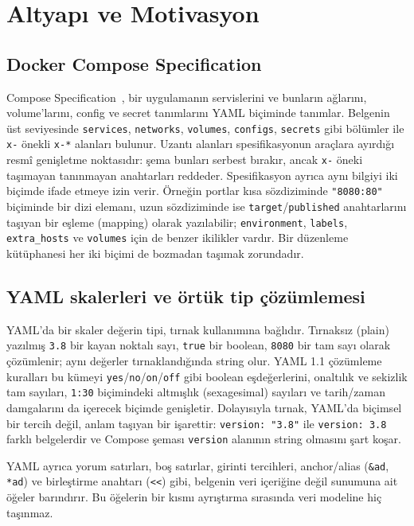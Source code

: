 \documentclass[conference]{IEEEtran}
\begin{document}
\section{Altyapı ve Motivasyon}
\label{sec:altyapi}

\subsection{Docker Compose Specification}
Compose Specification~\cite{composespec}, bir uygulamanın servislerini ve
bunların ağlarını, volume'larını, config ve secret tanımlarını YAML
biçiminde tanımlar. Belgenin üst seviyesinde \texttt{services},
\texttt{networks}, \texttt{volumes}, \texttt{configs}, \texttt{secrets} gibi
bölümler ile \texttt{x-} önekli \texttt{x-*} alanları bulunur. Uzantı
alanları spesifikasyonun araçlara ayırdığı resmî genişletme noktasıdır:
şema bunları serbest bırakır, ancak \texttt{x-} öneki taşımayan tanınmayan
anahtarları reddeder. Spesifikasyon ayrıca aynı bilgiyi iki biçimde ifade
etmeye izin verir. Örneğin portlar kısa sözdiziminde
\texttt{"8080:80"} biçiminde bir dizi elemanı, uzun sözdiziminde ise
\texttt{target}/\texttt{published} anahtarlarını taşıyan bir eşleme
(mapping) olarak yazılabilir; \texttt{environment}, \texttt{labels},
\texttt{extra\_hosts} ve \texttt{volumes} için de benzer ikilikler vardır.
Bir düzenleme kütüphanesi her iki biçimi de bozmadan taşımak zorundadır.

\subsection{YAML skalerleri ve örtük tip çözümlemesi}
YAML'da bir skaler değerin tipi, tırnak kullanımına bağlıdır. Tırnaksız
(plain) yazılmış \texttt{3.8} bir kayan noktalı sayı, \texttt{true} bir
boolean, \texttt{8080} bir tam sayı olarak çözümlenir; aynı değerler
tırnaklandığında string olur. YAML 1.1 çözümleme kuralları bu kümeyi
\texttt{yes}/\texttt{no}/\texttt{on}/\texttt{off} gibi boolean eşdeğerlerini,
onaltılık ve sekizlik tam sayıları, \texttt{1:30} biçimindeki altmışlık
(sexagesimal) sayıları ve tarih/zaman damgalarını da içerecek biçimde
genişletir. Dolayısıyla tırnak, YAML'da biçimsel bir tercih değil, anlam
taşıyan bir işarettir: \texttt{version: "3.8"} ile \texttt{version: 3.8}
farklı belgelerdir ve Compose şeması \texttt{version} alanının string
olmasını şart koşar.

YAML ayrıca yorum satırları, boş satırlar, girinti tercihleri, anchor/alias
(\texttt{\&ad}, \texttt{*ad}) ve birleştirme anahtarı (\texttt{<<}) gibi,
belgenin veri içeriğine değil sunumuna ait öğeler barındırır. Bu öğelerin
bir kısmı ayrıştırma sırasında veri modeline hiç taşınmaz.
\end{document}
